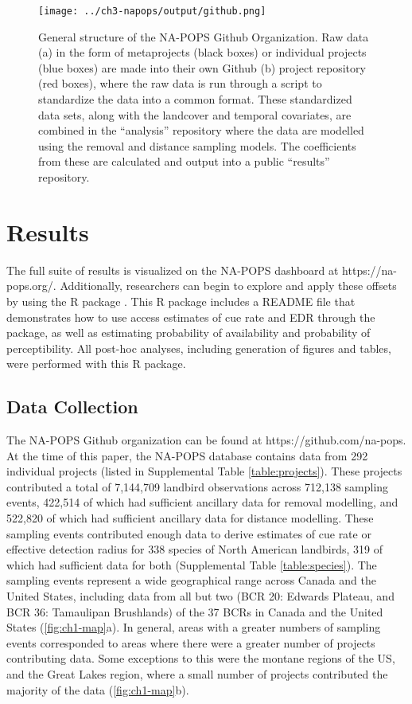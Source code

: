 \begin{figure}[h]
	\centering
	\texttt{[image: ../ch3-napops/output/github.png]}
	\caption{\label{fig:github}General structure of the NA-POPS Github Organization.  Raw data (a) in the form of metaprojects (black boxes) or individual projects (blue boxes) are made into their own Github (b) project repository (red boxes), where the raw data is run through a script to standardize the data into a common format. These standardized data sets, along with the landcover and temporal covariates, are combined in the “analysis” repository where the data are modelled using the removal and distance sampling models. The coefficients from these are calculated and output into a public “results” repository.}
\end{figure}

\section{Results}

The full suite of results is visualized on the NA-POPS dashboard at https://na-pops.org/. Additionally, researchers can begin to explore and apply these offsets by using the R package  \citep{edwards_napops_2024}. This R package includes a README file that demonstrates how to use access estimates of cue rate and EDR through the package, as well as estimating probability of availability and probability of perceptibility. All post-hoc analyses, including generation of figures and tables, were performed with this R package. 

\subsection{Data Collection}
\par The NA-POPS Github organization can be found at https://github.com/na-pops. At the time of this paper, the NA-POPS database contains data from 292 individual projects (listed in Supplemental Table \ref{table:projects}). These projects contributed a total of 7,144,709 landbird observations across 712,138 sampling events, 422,514 of which had sufficient ancillary data for removal modelling, and 522,820 of which had sufficient ancillary data for distance modelling. These sampling events contributed enough data to derive estimates of cue rate or effective detection radius for 338 species of North American landbirds, 319 of which had sufficient data for both (Supplemental Table \ref{table:species}). The sampling events represent a wide geographical range across Canada and the United States, including data from all but two (BCR 20: Edwards Plateau, and BCR 36: Tamaulipan Brushlands) of the 37 BCRs in Canada and the United States (\autoref{fig:ch1-map}a). In general, areas with a greater numbers of sampling events corresponded to areas where there were a greater number of projects contributing data. Some exceptions to this were the montane regions of the US, and the Great Lakes region, where a small number of projects contributed the majority of the data (\autoref{fig:ch1-map}b).

